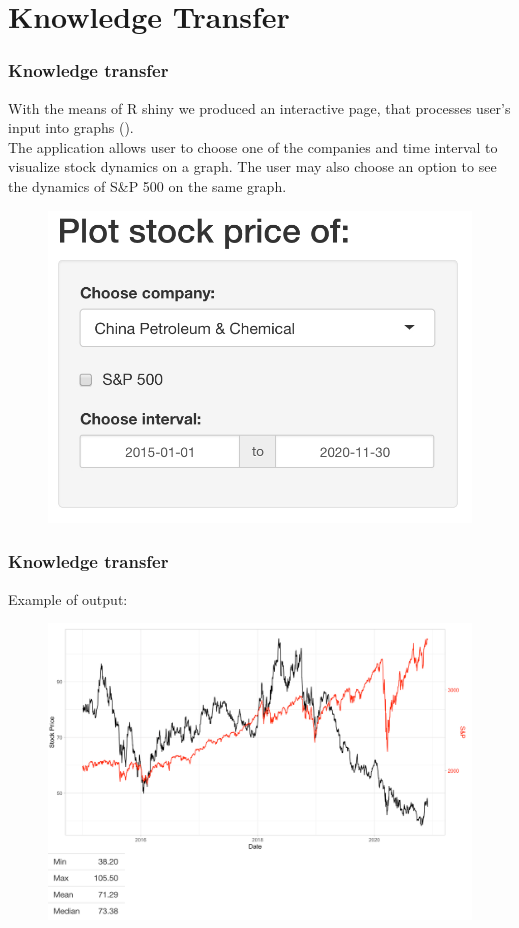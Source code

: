 \documentclass {beamer}
\begin{document}
\section{Knowledge Transfer}
\begin{frame}
\frametitle{Knowledge transfer}
With the means of R shiny we produced an interactive page, that processes user's input into graphs ().\\
The application allows user to choose one of the companies and time interval to visualize stock dynamics on a graph. The user may also choose an option to see the dynamics of S\&P 500 on the same graph.\\

\begin{figure}[!h]
\includegraphics[scale=0.25]{screenshot1}
\label{fig:ss1}
\end{figure}
\end{frame}


\begin{frame}
\frametitle{Knowledge transfer}
Example of output:

\begin{figure}[!h]
\includegraphics[scale=0.18]{screenshot2}
\label{fig:ss1}
\end{figure}
\end{frame}
\end{document}
